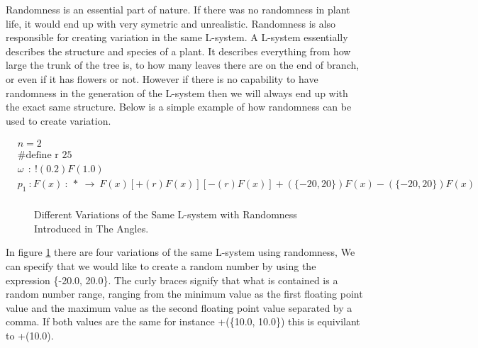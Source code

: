 \begin{flushleft}

Randomness is an essential part of nature. If there was no randomness in plant life, it would end up with very symetric and unrealistic. Randomness is also responsible for creating variation in the same L-system. A L-system essentially describes the structure and species of a plant. It describes everything from how large the trunk of the tree is, to how many leaves there are on the end of branch, or even if it has flowers or not. However if there is no capability to have randomness in the generation of the L-system then we will always end up with the exact same structure. 
\vspace{5mm}
Below is a simple example of how randomness can be used to create variation.

\begin{equation} \label{randomness example}
\begin{aligned}
	&n=2\\
	&\text{\#define r 25} \\
	&\omega~~ :~ !(0.2)F(1.0)\\
	&p_1~ :  F(x)~ :~ *~ \rightarrow~ F(x)[+(r)F(x)][-(r)F(x)]+(\{-20, 20\})F(x)-(\{-20, 20\})F(x)\\
\end{aligned}
\end{equation}

\begin{figure}[htbp]

	{\centering
		\vspace{7px}
		\setlength{\fboxrule}{1pt}
		\caption{Different Variations of the Same L-system with Randomness Introduced in The Angles. \label{figRandomness}}
	}
\end{figure}

\FloatBarrier

In figure \ref{figRandomness} there are four variations of the same L-system using randomness, We can specify that we would like to create a random number by using the expression \{-20.0, 20.0\}. The curly braces signify that what is contained is a random number range, ranging from the minimum value as the first floating point value and the maximum value as the second floating point value separated by a comma. If both values are the same for instance +(\{10.0, 10.0\}) this is equivilant to +(10.0).

\end{flushleft}


